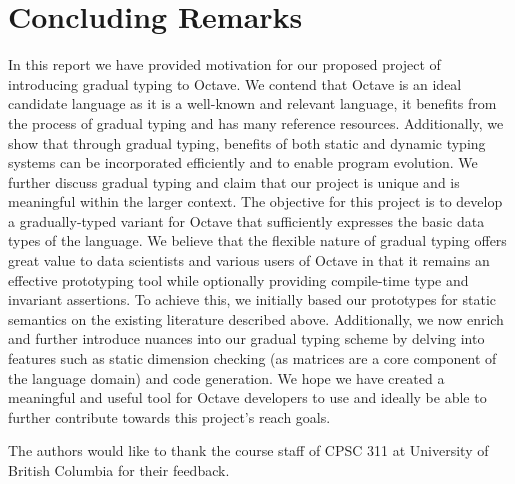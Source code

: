 \section{Concluding Remarks}
In this report we have provided motivation for our proposed project of introducing gradual typing to Octave. We contend that Octave is an ideal candidate language as it is a well-known and relevant language, it benefits from the process of gradual typing and has many reference resources. Additionally, we show that through gradual typing, benefits of both static and dynamic typing systems can be incorporated efficiently and to enable program evolution. We further discuss gradual typing and claim that our project is unique and is meaningful within the larger context. The objective for this project is to develop a gradually-typed variant for Octave that sufficiently expresses the basic data types of the language. We believe that the flexible nature of gradual typing offers great value to data scientists and various users of Octave in that it remains an effective prototyping tool while optionally providing compile-time type and invariant assertions. To achieve this, we initially based our prototypes for static semantics on the existing literature described above. Additionally, we now enrich and further introduce nuances into our gradual typing scheme by delving into features such as static dimension checking (as matrices are a core component of the language domain) and code generation. We hope we have created a meaningful and useful tool for Octave developers to use and ideally be able to further contribute towards this project's reach goals.

\appendix

\begin{acks}
    The authors would like to thank the course staff of CPSC 311 at University
    of British Columbia for their feedback.
\end{acks}
